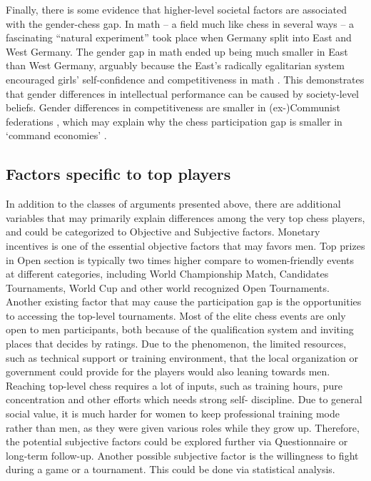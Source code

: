 \documentclass[9pt,twocolumn,twoside,lineno]{pnas-new}
\begin{document}
Finally, there is some evidence that higher-level societal factors are associated with the gender-chess gap. In math -- a field much like chess in several ways -- a fascinating ``natural experiment'' took place when Germany split into East and West Germany. The gender gap in math ended up being much smaller in East than West Germany, arguably because the East's radically egalitarian system encouraged girls’ self-confidence and competitiveness in math \cite{lippmann2018math}. This demonstrates that gender differences in intellectual performance can be caused by society-level beliefs. Gender differences in competitiveness are smaller in (ex-)Communist federations \cite{zhang2018}, which may explain why the chess participation gap is smaller in `command economies' \cite{dilmaghani2021}.



\subsection*{Factors specific to top players}
In addition to the classes of arguments presented above, there are additional variables that may primarily explain differences among the very top chess players, and could be categorized to Objective and Subjective factors.
Monetary incentives is one of the essential objective factors that may favors men. Top prizes in Open section is typically two times higher compare to women-friendly events at different categories, including World Championship Match, Candidates Tournaments, World Cup and other world recognized Open Tournaments. Another existing factor that may cause the participation gap is the opportunities to accessing the top-level tournaments. Most of the elite chess events are only open to men participants, both because of the qualification system and inviting places that decides by ratings. Due to the phenomenon, the limited resources, such as technical support or training environment, that the local organization or government could provide for the players would also leaning towards men.
Reaching top-level chess requires a lot of inputs, such as training hours, pure concentration and other efforts which needs strong self- discipline. Due to general social value, it is much harder for women to keep professional training mode rather than men, as they were given various roles while they grow up. Therefore, the potential subjective factors could be explored further via Questionnaire or long-term follow-up. Another possible subjective factor is the willingness to fight during a game or a tournament. This could be done via statistical analysis.
\end{document}
